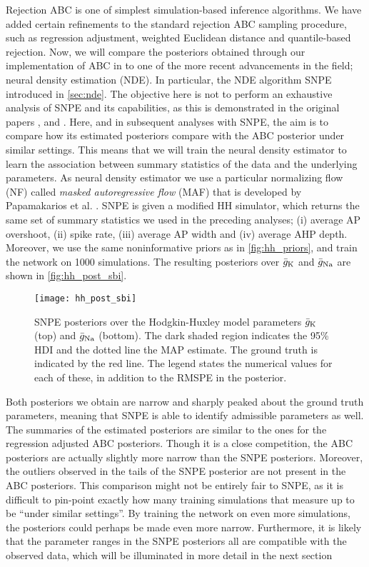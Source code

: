 Rejection ABC is one of simplest simulation-based inference algorithms. We have added certain refinements to the standard rejection ABC sampling procedure, such as regression adjustment, weighted Euclidean distance and quantile-based rejection. Now, we will compare the posteriors obtained through our implementation of ABC in  to one of the more recent advancements in the field; neural density estimation (NDE). In particular, the NDE algorithm SNPE introduced in \cref{sec:nde}. The objective here is not to perform an exhaustive analysis of SNPE and its capabilities, as this is demonstrated in the original papers \cite{SNL_first}, \cite{SNPE_first} and \cite{SNPE_apt}. Here, and in subsequent analyses with SNPE, the aim is to compare how its estimated posteriors compare with the ABC posterior under similar settings. This means that we will train the neural density estimator to learn the association between summary statistics of the data and the underlying parameters. As neural density estimator we use a particular normalizing flow (NF) called \textit{masked autoregressive flow} (MAF) that is developed by Papamakarios et al. \cite{MAF}. SNPE is given a modified HH simulator, which returns the same set of summary statistics we used in the preceding analyses; (i) average AP overshoot, (ii) spike rate, (iii) average AP width and (iv) average AHP depth. Moreover, we use the same noninformative priors as in \autoref{fig:hh_priors}, and train the network on 1000 simulations. The resulting posteriors over $\bar{g}_{\mathrm{K}}$ and $\bar{g}_{\mathrm{Na}}$ are shown in \autoref{fig:hh_post_sbi}.
\begin{figure}[H]
    \centering
    \texttt{[image: hh\_post\_sbi]}
    \caption{SNPE posteriors over the Hodgkin-Huxley model parameters $\bar{g}_{\mathrm{K}}$ (top) and $\bar{g}_{\mathrm{Na}}$ (bottom). The dark shaded region indicates the 95\% HDI and the dotted line the MAP estimate. The ground truth is indicated by the red line. The legend states the numerical values for each of these, in addition to the RMSPE in the posterior.}
    \label{fig:hh_post_sbi}
\end{figure}
Both posteriors we obtain are narrow and sharply peaked about the ground truth parameters, meaning that SNPE is able to identify admissible parameters as well. The summaries of the estimated posteriors are similar to the ones for the regression adjusted ABC posteriors. Though it is a close competition, the ABC posteriors are actually slightly more narrow than the SNPE posteriors. Moreover, the outliers observed in the tails of the SNPE posterior are not present in the ABC posteriors. This comparison might not be entirely fair to SNPE, as it is difficult to pin-point exactly how many training simulations that measure up to be “under similar settings”. By training the network on even more simulations, the posteriors could perhaps be made even more narrow. Furthermore, it is likely that the parameter ranges in the SNPE posteriors all are compatible with the observed data, which will be illuminated in more detail in the next section


